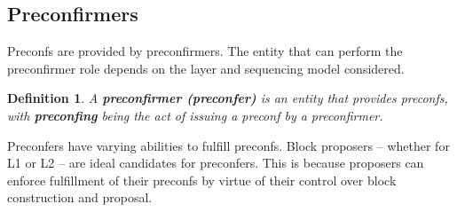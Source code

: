 \documentclass[a4paper]{article}
\theoremstyle{boldstyle}
\newtheorem{definitionx}{Definition}
\newenvironment{definition}
  {\begin{defopenboxq}\begin{definitionx}}
  {\end{definitionx}\end{defopenboxq}}
\newcommand{\cm}[1]{\textcolor{blue}{\textbf{Conor:} #1}}
\newcommand{\qb}[1]{\textcolor{red}{\textbf{Quentin:} #1}}
\newcommand{\ks}[1]{\textcolor{purple}{\textbf{Katerina:} #1}}
\begin{document}

        

    
    
    \subsection{Preconfirmers}
    \label{sec:preconfirmers_preliminaries}
        Preconfs are provided by preconfirmers. The entity that can perform the preconfirmer role depends on the layer and sequencing model considered. 
        \begin{definition}
        A \textbf{preconfirmer (preconfer)} is an entity that provides preconfs, with \textbf{preconfing} being the act of issuing a preconf by a preconfirmer.  
        \end{definition}
        
        Preconfers have varying abilities to fulfill preconfs. Block proposers -- whether for L1 or L2 -- are ideal candidates for preconfers. This is because proposers can enforce fulfillment of their preconfs by virtue of their control over block construction and proposal.
        
\end{document}
